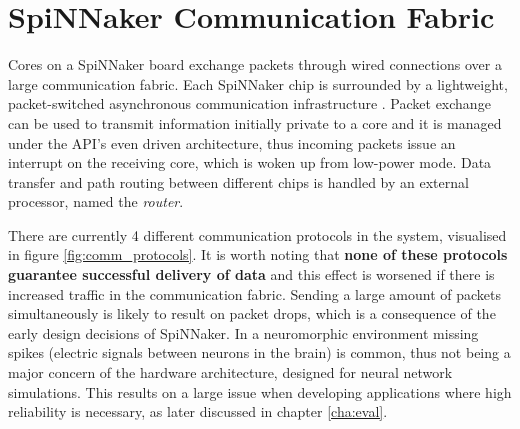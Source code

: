 \section{SpiNNaker Communication Fabric}
\label{sec:comm_fabric}

Cores on a SpiNNaker board exchange packets through wired connections over a large communication fabric. Each SpiNNaker chip is surrounded by a lightweight, packet-switched asynchronous communication infrastructure \cite{spinnchip}. Packet exchange can be used to transmit information initially private to a core and it is managed under the API's even driven architecture, thus incoming packets issue an interrupt on the receiving core, which is woken up from low-power mode. Data transfer and path routing between different chips is handled by an external processor, named the \textit{router}.

There are currently 4 different communication protocols in the system, visualised in figure \ref{fig:comm_protocols}. It is worth noting that \textbf{none of these protocols guarantee successful delivery of data} and this effect is worsened if there is increased traffic in the communication fabric. Sending a large amount of packets simultaneously is likely to result on packet drops, which is a consequence of the early design decisions of SpiNNaker. In a neuromorphic environment missing spikes (electric signals between neurons in the brain) is common, thus not being a major concern of the hardware architecture, designed for neural network simulations. This results on a large issue when developing applications where high reliability is necessary, as later discussed in chapter \ref{cha:eval}.

